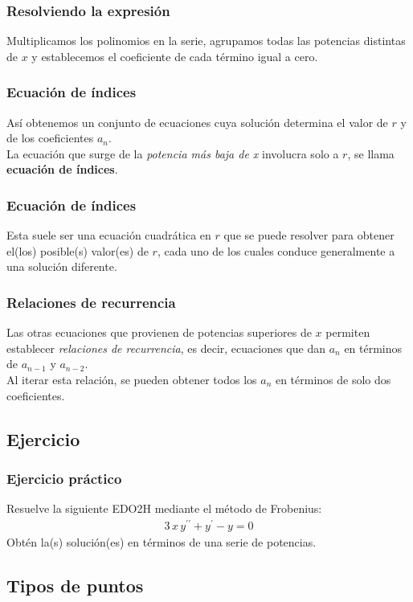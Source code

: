 \documentclass[12pt]{beamer}
\begin{document}
\begin{frame}
\frametitle{Resolviendo la expresión}
Multiplicamos los polinomios en la serie, agrupamos todas las potencias distintas de $x$ y establecemos el coeficiente de cada término igual a cero.
\end{frame}
\begin{frame}
\frametitle{Ecuación de índices}
Así obtenemos un conjunto de ecuaciones cuya solución determina el valor de $r$ y de los coeficientes $a_{n}$.
\\
\bigskip
\pause
La ecuación que surge de la \emph{potencia más baja de x} involucra solo a $r$, se llama \textbf{ecuación de índices}.
\end{frame}
\begin{frame}
\frametitle{Ecuación de índices}
Esta suele ser una ecuación cuadrática en $r$ que se puede resolver para obtener el(los) posible(s) valor(es) de $r$, cada uno de los cuales conduce generalmente a una solución diferente.
\end{frame}
\begin{frame}
\frametitle{Relaciones de recurrencia}
Las otras ecuaciones que provienen de potencias superiores de $x$ permiten establecer \emph{relaciones de recurrencia}, es decir, ecuaciones que dan $a_{n}$ en términos de $a_{n-1}$ y $a_{n-2}$.
\\
\bigskip
Al iterar esta relación, se pueden obtener todos los $a_{n}$ en términos de solo dos coeficientes.
\end{frame}
\subsection{Ejercicio}
\begin{frame}
\frametitle{Ejercicio práctico}
Resuelve la siguiente EDO2H mediante el método de Frobenius:
\begin{align}
3 \, x \, y^{\prime \prime} + y^{\prime} - y = 0
\label{eq:ecuacion_04}    
\end{align}
\pause
Obtén la(s) solución(es) en términos de una serie de potencias.
\end{frame}

\subsection*{Tipos de puntos}
\end{document}
